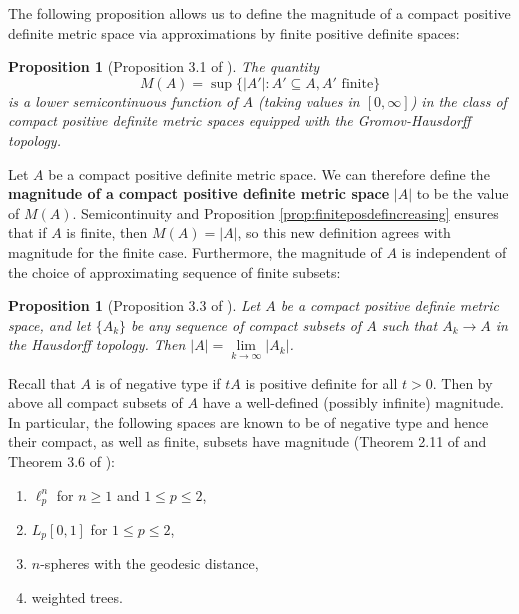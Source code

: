 \documentclass[11pt]{article}
\theoremstyle{mythm}
\newtheorem{prop}[defn]{Proposition}
\begin{document}
The following proposition allows us to define the magnitude of a compact positive definite metric space via approximations by finite positive definite spaces:

\begin{prop}[Proposition 3.1 of \cite{leinster_magnitude_2017}]\label{prop:MAlsc}
The quantity
\begin{equation*}
M(A) = \sup\{\vert A'\vert : A' \subseteq A, \text{$A'$ finite}\}
\end{equation*}
is a lower semicontinuous function of $A$ (taking values in $[0,\infty]$) in the class of compact positive definite metric spaces equipped with the Gromov-Hausdorff topology.
\end{prop}

Let $A$ be a compact positive definite metric space. We can therefore define the \textbf{magnitude of a compact positive definite metric space} $\vert A \vert$ to be the value of $M(A)$. Semicontinuity and Proposition \ref{prop:finiteposdefincreasing} ensures that if $A$ is finite, then $M(A) = \vert A \vert$, so this new definition agrees with magnitude for the finite case. Furthermore, the magnitude of $A$ is independent of the choice of approximating sequence of finite subsets:

\begin{prop}[Proposition 3.3 of \cite{leinster_magnitude_2017}]\label{prop:finiteapprox}
Let $A$ be a compact positive definie metric space, and let $\{A_k\}$ be any sequence of compact subsets of $A$ such that $A_k\to A$ in the Hausdorff topology. Then $\vert A \vert = \lim\limits_{k\to\infty}\vert A_k\vert$.
\end{prop}

Recall that $A$ is of negative type if $tA$ is positive definite for all $t > 0$. Then by above all compact subsets of $A$ have a well-defined (possibly infinite) magnitude. In particular, the following spaces are known to be of negative type and hence their compact, as well as finite, subsets have magnitude (Theorem 2.11 of \cite{leinster_magnitude_2017} and Theorem 3.6 of \cite{meckes_positive_2013}):

\begin{enumerate}[label=\arabic*.]
\item $\ell^n_p$ for $n\geq1$ and $1\leq p \leq 2$,
\item $L_p[0,1]$ for $1\leq p \leq 2$,
\item $n$-spheres with the geodesic distance,
\item weighted trees.
\end{enumerate}
\end{document}
